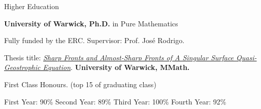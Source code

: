 \begin{rubric}{Higher Education}

\entry*[2015 -- 2019]%
	\textbf{University of Warwick, Ph.D.}  in Pure Mathematics	\par  Fully funded by the ERC. Supervisor: Prof. Jos\'e Rodrigo. \par Thesis title: \href{http://wrap.warwick.ac.uk/150235}{\emph{Sharp Fronts and Almost-Sharp Fronts of A Singular Surface Quasi-Geostrophic Equation}}.
%
\entry*[2011 -- 2015]%
	\textbf{University of Warwick, MMath.}\par
	First Class Honours. (top 15 of graduating class)
	\par
	    First Year: 90\% \hspace{1.5em} Second Year: 89\% \hspace{1.5em}  Third Year: 100\% \hspace{1.5em}  Fourth Year: 92\%
 \end{rubric}